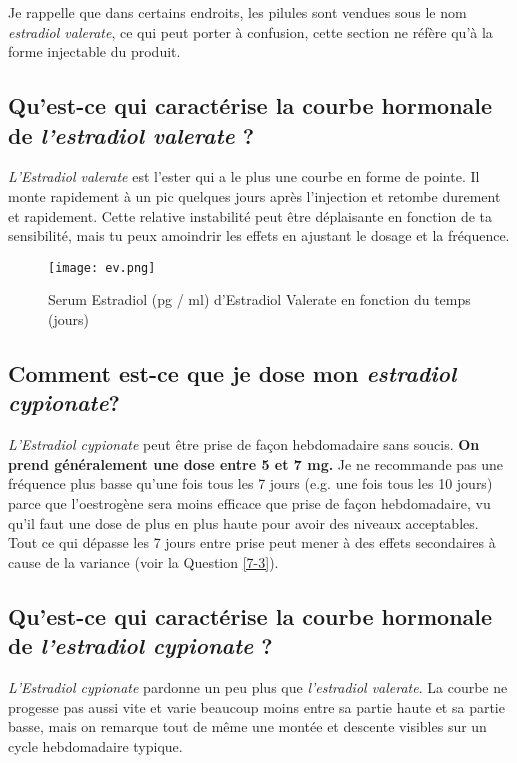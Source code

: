 \documentclass{article}
\begin{document}
Je rappelle que dans certains endroits, les pilules sont vendues sous le nom \textit{estradiol valerate}, ce qui peut porter à confusion, cette section ne réfère qu'à la forme injectable du produit.

\subsection{Qu'est-ce qui caractérise la courbe hormonale de \textit{l'estradiol valerate} ?}

\textit{L'Estradiol valerate} est l'ester qui a le plus une courbe en forme de pointe. Il monte rapidement à un pic quelques jours après l'injection et retombe durement et rapidement. Cette relative instabilité peut être déplaisante en fonction de ta sensibilité, mais tu peux amoindrir les effets en ajustant le dosage et la fréquence.

 \begin{figure}[H]
     \centering
     \texttt{[image: ev.png]}
     \caption{Serum Estradiol (pg / ml) d'Estradiol Valerate en fonction du temps (jours) }
     \label{fig:ev}
 \end{figure}

\subsection{Comment est-ce que je dose mon \textit{estradiol cypionate}?}

\textit{L'Estradiol cypionate} peut être prise de façon hebdomadaire sans soucis. \textbf{On prend généralement une dose entre 5 et 7 mg.} Je ne recommande pas une fréquence plus basse qu'une fois tous les 7 jours (e.g. une fois tous les 10 jours) parce que l'oestrogène sera moins efficace que prise de façon hebdomadaire, vu qu'il faut une dose de plus en plus haute pour avoir des niveaux acceptables. Tout ce qui dépasse les 7 jours entre prise peut mener à des effets secondaires à cause de la variance (voir la Question \ref{7-3}). 

\subsection{Qu'est-ce qui caractérise la courbe hormonale de \textit{l'estradiol cypionate} ?}

\textit{L'Estradiol cypionate} pardonne un peu plus que \textit{l'estradiol valerate}. La courbe ne progesse pas aussi vite et varie beaucoup moins entre sa partie haute et sa partie basse, mais on remarque tout de même une montée et descente visibles sur un cycle hebdomadaire typique.
\end{document}
